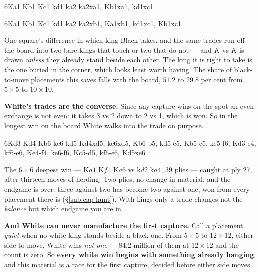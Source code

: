 \documentclass[10pt]{article}
\begin{document}
\medskip
\noindent
\begin{stepboard}[width=0.30\textwidth,board=2.44cm,height=42mm,variant=C,
  intro={\textbf{1\ldots\,k$a2\times a1$ draws:} the bare kings stand on $a1$
  and $c1$, two apart}]{6}{Ka1 Kb1 Kc1 kd1 ka2}
  ka2xa1, Kb1xa1, kd1xc1
\end{stepboard}\hfill
\begin{stepboard}[width=0.30\textwidth,board=2.44cm,height=42mm,variant=C,
  intro={\textbf{1\ldots\,k$a2\times b1$ loses in 19:} they stand on $b1$ and
  $c1$, and touch}]{6}{Ka1 Kb1 Kc1 kd1 ka2}
  ka2xb1, Ka1xb1, kd1xc1, Kb1xc1
\end{stepboard}\hfill
\begin{minipage}[t]{0.34\textwidth}\vspace{0pt}\small
One square's difference in which king Black takes, and the same trades run off
the board into two bare kings that touch or two that do not --- and $K$ vs $K$
is drawn \emph{unless} they already stand beside each other. The king it is
right to take is the one buried in the corner, which looks least worth having.
The share of black-to-move placements this saves falls with the board, $51.2$
to $29.8$ per cent from $5\times5$ to $10\times10$.
\end{minipage}

\medskip
\noindent
\textbf{White's trades are the converse.} Since any capture wins on the spot an
even exchange is not even: it takes 3 vs 2 down to 2 vs 1, which is won. So in
the longest win on the board White walks into the trade on purpose.

\medskip
\noindent
\begin{minipage}[t]{0.34\textwidth}
\begin{stepboard}[width=\linewidth,board=2.89cm,height=46mm,variant=C,
  intro={$6\times6$, White to move, wins in 13}]{6}{Kd3 Kd4 Kb6 ke6 kd5}
  Kd4xd5, ke6xd5, Kb6-b5, kd5-e5, Kb5-c5, ke5-f6, Kd3-e4,
  kf6-e6, Ke4-f4, ke6-f6, Kc5-d5, kf6-e6, Kd5xe6
\end{stepboard}
\end{minipage}\hfill
\begin{minipage}[t]{0.62\textwidth}\vspace{0pt}\small
The $6\times6$ deepest win --- K$a1$ K$f1$ K$a6$ vs k$d2$ k$a4$, 39 plies ---
caught at ply 27, after thirteen moves of herding. Two plies, no change in
material, and the endgame is over: three against two has become two against
one, won from every placement there is (\S\ref{sub:cap-hunt}). With kings only
a trade changes not the \emph{balance} but which endgame you are in.

\smallskip
\textbf{And White can never manufacture the first capture.} Call a placement
\emph{quiet} when no white king stands beside a black one. From $5\times5$ to
$12\times12$, either side to move, White wins \emph{not one} --- 84.2 million
of them at $12\times12$ and the count is zero. So \textbf{every white win
begins with something already hanging}, and this material is a race for the
first capture, decided before either side moves.
\end{minipage}
\end{document}
